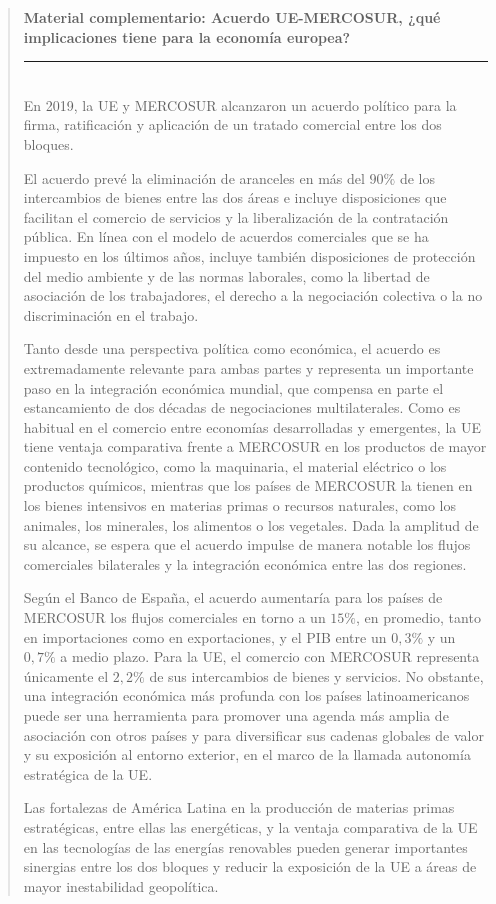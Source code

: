 \documentclass[10pt,a4paper]{article}
\newenvironment{specialblock}[1]{%
      \begin{quote} %
      \small %
      \noindent\textbf{#1}\\[-0.3em] %
      \rule{\linewidth}{0.4pt}\\[0.6em]}{
      \end{quote}}
\begin{document}
\begin{specialblock}{\textbf{Material complementario:} Acuerdo UE-MERCOSUR, ¿qué implicaciones tiene para la economía europea?}
    En 2019, la UE y MERCOSUR alcanzaron un acuerdo político para la firma, ratificación y aplicación de un tratado comercial entre los dos bloques. 
    
    El acuerdo prevé la eliminación de aranceles en más del $90\%$ de los intercambios de bienes entre las dos áreas e incluye disposiciones que facilitan el comercio de servicios y la liberalización de la contratación pública. En línea con el modelo de acuerdos comerciales que se ha impuesto en los últimos años, incluye también disposiciones de protección del medio ambiente y de las normas laborales, como la libertad de asociación de los trabajadores, el derecho a la negociación colectiva o la no discriminación en el trabajo.

    Tanto desde una perspectiva política como económica, el acuerdo es extremadamente relevante para ambas partes y representa un importante paso en la integración económica mundial, que compensa en parte el estancamiento de dos décadas de negociaciones multilaterales. Como es habitual en el comercio entre economías desarrolladas y emergentes, la UE tiene ventaja comparativa frente a MERCOSUR en los productos de mayor contenido tecnológico, como la maquinaria, el material eléctrico o los productos químicos, mientras que los países de MERCOSUR la tienen en los bienes intensivos en materias primas o recursos naturales, como los animales, los minerales, los alimentos o los vegetales. Dada la amplitud de su alcance, se espera que el acuerdo impulse de manera notable los flujos comerciales bilaterales y la integración económica entre las dos regiones.

    Según el Banco de España, el acuerdo aumentaría para los países de MERCOSUR los flujos comerciales en torno a un $15\%$, en promedio, tanto en importaciones como en exportaciones, y el PIB entre un $0,3\%$ y un $0,7\%$ a medio plazo. Para la UE, el comercio con MERCOSUR representa únicamente el $2,2\%$ de sus intercambios de bienes y servicios. No obstante, una integración económica más profunda con los países latinoamericanos puede ser una herramienta para promover una agenda más amplia de asociación con otros países y para diversificar sus cadenas globales de valor y su exposición al entorno exterior, en el marco de la llamada autonomía estratégica de la UE. 
    
    Las fortalezas de América Latina en la producción de materias primas estratégicas, entre ellas las energéticas, y la ventaja comparativa de la UE en las tecnologías de las energías renovables pueden generar importantes sinergias entre los dos bloques y reducir la exposición de la UE a áreas de mayor inestabilidad geopolítica.


\end{specialblock}
\end{document}

